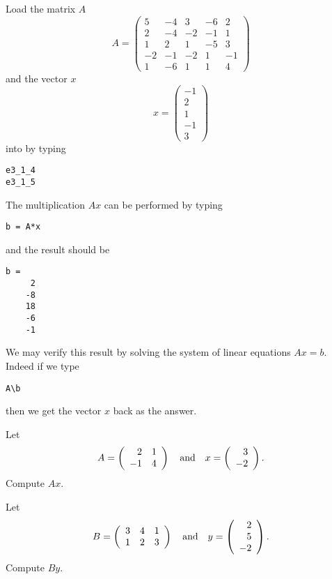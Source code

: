 \documentclass{ximera}
\begin{document}
Load the matrix $A$
\begin{equation*}  \label{eq:5matrix}
A=\left(
\begin{array}{rrrrr}
 5 & -4 &  3 & -6 &  2 \\
 2 & -4 & -2 & -1 &  1 \\
 1 &  2 &  1 & -5 &  3 \\
-2 & -1 & -2 &  1 & -1 \\
 1 & -6 &  1 &  1 &  4
\end{array}
\right)
\end{equation*}
and the vector $x$
\begin{equation*} \label{eq:5rhs}
x=\left(
\begin{array}{r}
 -1 \\
  2 \\
  1 \\
 -1 \\
  3
\end{array}
\right)
\end{equation*}
into \Matlab by typing
\begin{verbatim}
e3_1_4
e3_1_5
\end{verbatim}
The multiplication $Ax$ can be performed by typing
\begin{verbatim}
b = A*x
\end{verbatim}  \index{\computer!*}
and the result should be
\begin{verbatim}
b =
     2
    -8
    18
    -6
    -1
\end{verbatim}
We may verify this result by solving the system of linear
equations $Ax=b$.  Indeed if we type
\begin{verbatim}
A\b
\end{verbatim}  \index{\computer!$\backslash$}
then we get the vector $x$ back as the answer.

\EXER

\TEXER


\begin{exercise} \label{c4.1.1}
Let
\[
A = \left(\begin{array}{rr} 2 & 1\\ -1 &4\end{array}\right) \quad\mbox{and}\quad x = \left(\begin{array}{r} 3 \\ -2\end{array}\right).
\]
Compute $Ax$.
\end{exercise}

\begin{exercise} \label{c4.1.2}
Let
\[
B=\left(\begin{array}{ccc} 3 & 4 & 1\\ 1& 2 & 3 \end{array}\right)
\quad\mbox{and}\quad y=\left(\begin{array}{r} 2 \\ 5 \\ -2 \end{array}\right).
\]
Compute $By$.
\end{exercise}
\end{document}
